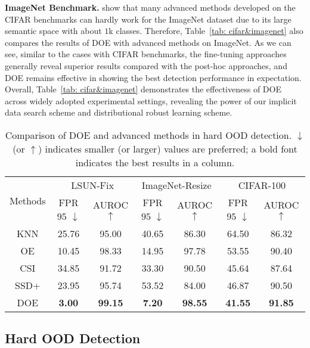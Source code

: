 \documentclass{article} \usepackage{iclr2022_conference,times}
\begin{document}
\textbf{ImageNet Benchmark.} \cite{HuangL21} show that many advanced methods developed on the CIFAR benchmarks can hardly work for the ImageNet dataset due to its large semantic space with about $1$k classes. Therefore, Table~\ref{tab: cifar&imagenet} also compares the results of DOE with advanced methods on ImageNet. As we can see, similar to the cases with CIFAR benchmarks, the fine-tuning approaches generally reveal superior results compared with the post-hoc approaches, and DOE remains effective in showing the best detection performance in expectation. Overall, Table~\ref{tab: cifar&imagenet} demonstrates the effectiveness of DOE across widely adopted experimental settings, revealing the power of our implicit data search scheme and distributional robust learning scheme. 


\begin{table}[]
\caption{Comparison of DOE and advanced methods in hard OOD detection. $\downarrow$ (or $\uparrow$) indicates smaller (or larger) values are preferred; a bold font indicates the best results in a column.} \label{tab: cifar hard}
\small
\centering
\begin{tabular}{c|cc|cc|cc}
\toprule[1.5pt]
\multirow{2}{*}{Methods} & \multicolumn{2}{c|}{LSUN-Fix}            & \multicolumn{2}{c|}{ImageNet-Resize} & \multicolumn{2}{c}{CIFAR-100}           \\
 \cline{2-7} 
 & FPR$95$ $\downarrow$ & AUROC $\uparrow$ & FPR$95$ $\downarrow$ & AUROC $\uparrow$ & FPR$95$ $\downarrow$ & AUROC $\uparrow$ \\
\midrule[1pt]
KNN         & 25.76 & 95.00 & 40.65 & 86.30 & 64.50 & 86.32 \\
OE          & 10.45 & 98.33 & 14.95 & 97.78 & 53.55 & 90.40 \\
CSI         & 34.85 & 91.72 & 33.30 & 90.50 & 45.64 & 87.64 \\
SSD+        & 23.95 & 95.74 & 53.52 & 84.00 & 46.87 & 90.50 \\
\hline
DOE         &  \textbf{3.00} & \textbf{99.15} &  \textbf{7.20} & \textbf{98.55} & \textbf{41.55} & \textbf{91.85}  \\
 \bottomrule[1.5pt]
\end{tabular}
\end{table}





\subsection{Hard OOD Detection} \label{sec: near OOD}
\end{document}
